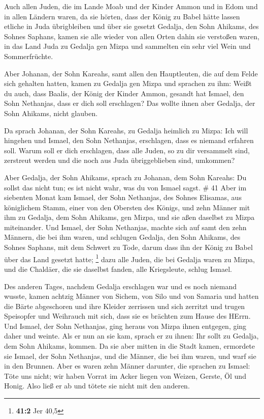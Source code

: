 Auch allen Juden, die im Lande Moab und der Kinder Ammon
und in Edom und in allen Ländern waren, da sie hörten, dass der König zu
Babel hätte lassen etliche in Juda übrigbleiben und über sie gesetzt
Gedalja, den Sohn Ahikams, des Sohnes Saphans,  kamen sie
alle wieder von allen Orten dahin sie verstoßen waren, in das Land Juda
zu Gedalja gen Mizpa und sammelten ein sehr viel Wein und Sommerfrüchte.

 Aber Johanan, der Sohn Kareahs, samt allen den
Hauptleuten, die auf dem Felde sich gehalten hatten, kamen zu Gedalja
gen Mizpa  und sprachen zu ihm: Weißt du auch, dass Baalis,
der König der Kinder Ammon, gesandt hat Ismael, den Sohn Nethanjas, dass
er dich soll erschlagen? Das wollte ihnen aber Gedalja, der Sohn
Ahikams, nicht glauben.

 Da sprach Johanan, der Sohn Kareahs, zu Gedalja heimlich
zu Mizpa: Ich will hingehen und Ismael, den Sohn Nethanjas, erschlagen,
dass es niemand erfahren soll. Warum soll er dich erschlagen, dass alle
Juden, so zu dir versammelt sind, zerstreut werden und die noch aus Juda
übriggeblieben sind, umkommen?

 Aber Gedalja, der Sohn Ahikams, sprach zu Johanan, dem
Sohn Kareahs: Du sollst das nicht tun; es ist nicht wahr, was du von
Ismael sagst. \# 41  Aber im siebenten Monat kam Ismael, der
Sohn Nethanjas, des Sohnes Elisamas, aus königlichem Stamm, einer von
den Obersten des Königs, und zehn Männer mit ihm zu Gedalja, dem Sohn
Ahikams, gen Mizpa, und sie aßen daselbst zu Mizpa miteinander.
 Und Ismael, der Sohn Nethanjas, machte sich auf samt den
zehn Männern, die bei ihm waren, und schlugen Gedalja, den Sohn Ahikams,
des Sohnes Saphans, mit dem Schwert zu Tode, darum dass ihn der König zu
Babel über das Land gesetzt hatte; \footnote{\textbf{41:2} Jer 40,5}
 dazu alle Juden, die bei Gedalja waren zu Mizpa, und die
Chaldäer, die sie daselbst fanden, alle Kriegsleute, schlug Ismael.

 Des anderen Tages, nachdem Gedalja erschlagen war und es
noch niemand wusste,  kamen achtzig Männer von Sichem, von
Silo und von Samaria und hatten die Bärte abgeschoren und ihre Kleider
zerrissen und sich zerritzt und trugen Speisopfer und Weihrauch mit
sich, dass sie es brächten zum Hause des HErrn.  Und Ismael,
der Sohn Nethanjas, ging heraus von Mizpa ihnen entgegen, ging daher und
weinte. Als er nun an sie kam, sprach er zu ihnen: Ihr sollt zu Gedalja,
dem Sohn Ahikams, kommen.  Da sie aber mitten in die Stadt
kamen, ermordete sie Ismael, der Sohn Nethanjas, und die Männer, die bei
ihm waren, und warf sie in den Brunnen.  Aber es waren zehn
Männer darunter, die sprachen zu Ismael: Töte uns nicht; wir haben
Vorrat im Acker liegen von Weizen, Gerste, Öl und Honig. Also ließ er ab
und tötete sie nicht mit den anderen.


